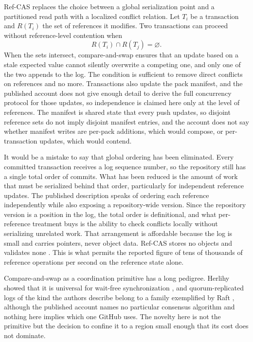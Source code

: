 \documentclass[11pt]{article}
\theoremstyle{definition}
\theoremstyle{plain}
\begin{document}
Ref-CAS replaces the choice between a global serialization point and a partitioned read path with a localized conflict relation. Let $T_i$ be a transaction and $R(T_i)$ the set of references it modifies. Two transactions can proceed without reference-level contention when
\[
R(T_i)\cap R(T_j)=\varnothing .
\]
When the sets intersect, compare-and-swap ensures that an update based on a stale expected value cannot silently overwrite a competing one, and only one of the two appends to the log. The condition is sufficient to remove direct conflicts on references and no more. Transactions also update the pack manifest, and the published account does not give enough detail to derive the full concurrency protocol for those updates, so independence is claimed here only at the level of references. The manifest is shared state that every push updates, so disjoint reference sets do not imply disjoint manifest entries, and the account does not say whether manifest writes are per-pack additions, which would compose, or per-transaction updates, which would contend.

It would be a mistake to say that global ordering has been eliminated. Every committed transaction receives a log sequence number, so the repository still has a single total order of commits. What has been reduced is the amount of work that must be serialized behind that order, particularly for independent reference updates. The published description speaks of ordering each reference independently while also exposing a repository-wide version. Since the repository version is a position in the log, the total order is definitional, and what per-reference treatment buys is the ability to check conflicts locally without serializing unrelated work. That arrangement is affordable because the log is small and carries pointers, never object data. Ref-CAS stores no objects and validates none \cite{raman2026}. This is what permits the reported figure of tens of thousands of reference operations per second on the reference state alone.

Compare-and-swap as a coordination primitive has a long pedigree. Herlihy showed that it is universal for wait-free synchronization \cite{herlihy1991}, and quorum-replicated logs of the kind the authors describe belong to a family exemplified by Raft \cite{ongaro2014}, although the published account names no particular consensus algorithm and nothing here implies which one GitHub uses. The novelty here is not the primitive but the decision to confine it to a region small enough that its cost does not dominate.
\end{document}
